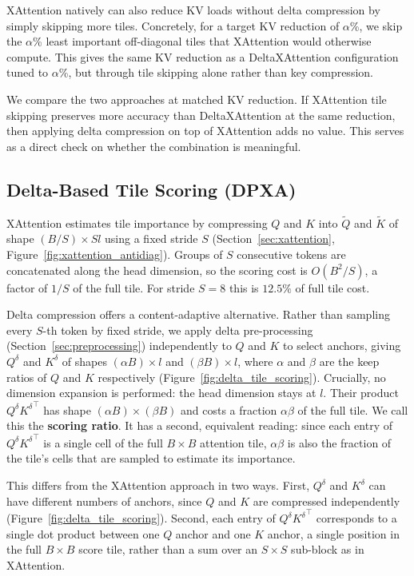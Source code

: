 XAttention natively can also reduce KV loads without delta compression by simply skipping more tiles. Concretely, for a target KV reduction of $\alpha$\%, we skip the $\alpha$\% least important off-diagonal tiles that XAttention would otherwise compute. This gives the same KV reduction as a DeltaXAttention configuration tuned to $\alpha$\%, but through tile skipping alone rather than key compression.

We compare the two approaches at matched KV reduction. If XAttention tile skipping preserves more accuracy than DeltaXAttention at the same reduction, then applying delta compression on top of XAttention adds no value. This serves as a direct check on whether the combination is meaningful.

\subsection{Delta-Based Tile Scoring (DPXA)}
\label{sec:delta_tile_scoring}

XAttention estimates tile importance by compressing $Q$ and $K$ into $\tilde{Q}$ and $\tilde{K}$ of shape $(B/S) \times Sl$ using a fixed stride $S$ (Section~\ref{sec:xattention}, Figure~\ref{fig:xattention_antidiag}). Groups of $S$ consecutive tokens are concatenated along the head dimension, so the scoring cost is $O(B^2/S)$, a factor of $1/S$ of the full tile. For stride $S=8$ this is $12.5\%$ of full tile cost.

Delta compression offers a content-adaptive alternative. Rather than sampling every $S$-th token by fixed stride, we apply delta pre-processing (Section~\ref{sec:preprocessing}) independently to $Q$ and $K$ to select anchors, giving $Q^\delta$ and $K^\delta$ of shapes $(\alpha B) \times l$ and $(\beta B) \times l$, where $\alpha$ and $\beta$ are the keep ratios of $Q$ and $K$ respectively (Figure~\ref{fig:delta_tile_scoring}). Crucially, no dimension expansion is performed: the head dimension stays at $l$. Their product $Q^\delta {K^\delta}^\top$ has shape $(\alpha B) \times (\beta B)$ and costs a fraction $\alpha \beta$ of the full tile. We call this the \textbf{scoring ratio}. It has a second, equivalent reading: since each entry of $Q^\delta {K^\delta}^\top$ is a single cell of the full $B \times B$ attention tile, $\alpha\beta$ is also the fraction of the tile's cells that are sampled to estimate its importance.

This differs from the XAttention approach in two ways. First, $Q^\delta$ and $K^\delta$ can have different numbers of anchors, since $Q$ and $K$ are compressed independently (Figure~\ref{fig:delta_tile_scoring}). Second, each entry of $Q^\delta {K^\delta}^\top$ corresponds to a single dot product between one $Q$ anchor and one $K$ anchor, a single position in the full $B \times B$ score tile, rather than a sum over an $S \times S$ sub-block as in XAttention.

